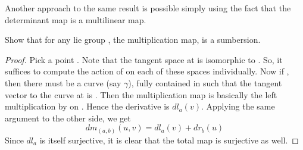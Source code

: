\documentclass{article}
\begin{document}
\begin{remark*}
    Another approach to the same result is possible simply using the fact that the determinant map is a multilinear map.
\end{remark*}

\begin{exercise*}
    Show that for any lie group , the multiplication map, is a sumbersion.
\end{exercise*}

\begin{proof}
    Pick a point . Note that the tangent space at  is isomorphic to . 
    So, it suffices to compute the action of  on each of these spaces individually. Now if , then
    there must be a curve (say $\gamma$), fully contained in  such that the tangent vector to the curve at  is .
    Then the multiplication map is basically the left multiplication by  on \mm{\gamma}. Hence the derivative is $dl_a(v)$. Applying the same argument to the other side, we get
    $$dm_{(a,b)}(u,v) = dl_a(v) + dr_b(u)$$
    Since $dl_a$ is itself surjective, it is clear that the total map is surjective as well.
\end{proof}
\end{document}
